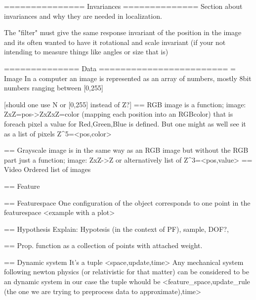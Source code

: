 =============== Invariances ==============
Section about invariances and why they are needed in localization.

The "filter" must give the same response invariant of the position in the image 
and its often wanted to have it rotational and scale invariant (if your not 
intending to measure things like angles or size that is)

============== Data ========================
= Image
In a computer an image is represented as an array of 
numbers, mostly 8bit numbers ranging between [0,255] 

[should one use N or [0,255] instead of Z?]
== RGB image is a function;
image: ZxZ=pos->ZxZxZ=color (mapping each position into an RGBcolor)
that is foreach pixel a value for Red,Green,Blue is defined.
But one might as well see it as a list of pixels Z^5=<pos,color>

== Grayscale image is in the same way as an RGB image but without the RGB part
just a function;
image: ZxZ->Z
or alternatively list of Z^3=<pos,value>
== Video
Ordered list of images


== Feature

== Featurespace
One configuration of the object corresponds to one point in the featurespace
<example with a plot>


== Hypothesis
Explain: Hypotesis (in the context of PF), sample, DOF?, 

== Prop. function as a collection of points with attached weight.


== Dynamic system
    It's a tuple <space,update,time>
    Any mechanical system following newton physics (or relativistic for that matter) can be considered to be an dynamic system
    in our case the tuple whould be <feature_space,update_rule (the one we are trying to preprocess data to approximate),time>




